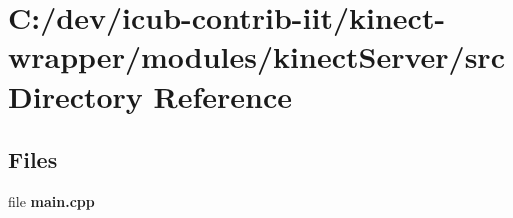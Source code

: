 \section{C\+:/dev/icub-\/contrib-\/iit/kinect-\/wrapper/modules/kinect\+Server/src Directory Reference}
\label{dir_a1b31a03c5999012deeb52e88e48b55d}
\subsection*{Files}
\begin{DoxyCompactItemize}
\item 
file {\bfseries main.\+cpp}
\end{DoxyCompactItemize}
